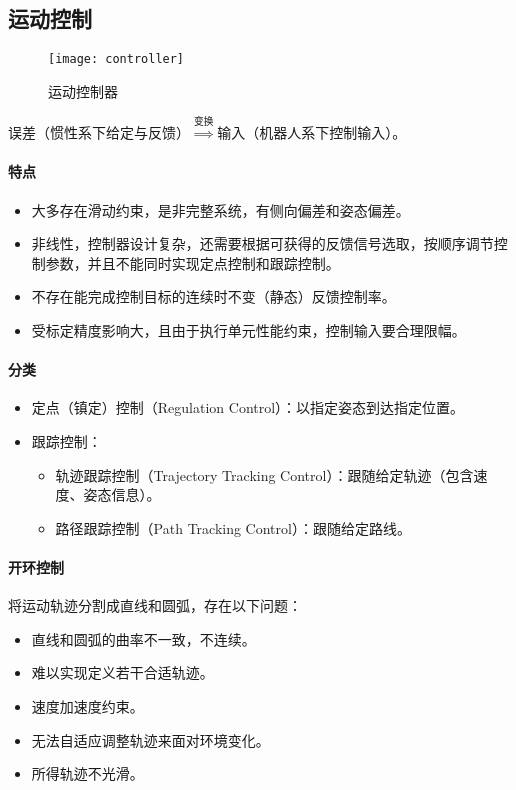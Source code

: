 \documentclass[
12pt, %
a4paper, 
oneside, %
headinclude,footinclude, %
]{scrartcl}
\begin{document}
\subsection[运动控制]{运动控制}\label{sec:motion_control}
\begin{figure}[H]
\centering 
\texttt{[image: controller]} 
\caption{运动控制器}
\end{figure}

误差（惯性系下给定与反馈）$ \overset{\text{变换}}{\Longrightarrow} $输入（机器人系下控制输入）。 
\paragraph{特点}
\begin{itemize}
\item 大多存在滑动约束，是非完整系统，有侧向偏差和姿态偏差。
\item 非线性，控制器设计复杂，还需要根据可获得的反馈信号选取，按顺序调节控制参数，并且不能同时实现定点控制和跟踪控制。
\item 不存在能完成控制目标的连续时不变（静态）反馈控制率。
\item 受标定精度影响大，且由于执行单元性能约束，控制输入要合理限幅。
\end{itemize}
\paragraph{分类}
\begin{itemize}
\item 定点（镇定）控制（Regulation Control）：以指定姿态到达指定位置。
\item 跟踪控制：
\begin{itemize}
\item 轨迹跟踪控制（Trajectory Tracking Control）：跟随给定轨迹（包含速度、姿态信息）。
\item 路径跟踪控制（Path Tracking Control）：跟随给定路线。
\end{itemize}
\end{itemize}
\paragraph{开环控制}
将运动轨迹分割成直线和圆弧，存在以下问题：
\begin{itemize}
\item 直线和圆弧的曲率不一致，不连续。
\item 难以实现定义若干合适轨迹。
\item 速度加速度约束。
\item 无法自适应调整轨迹来面对环境变化。
\item 所得轨迹不光滑。
\end{itemize}
\end{document}
